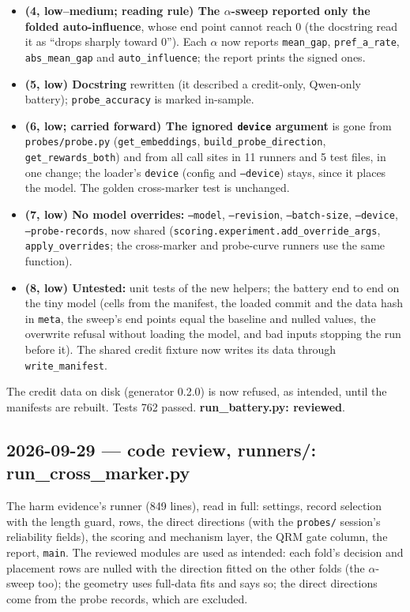 \documentclass{article}
\begin{document}
\begin{itemize}
  \item \textbf{(4, low--medium; reading rule) The $\alpha$-sweep reported only the folded auto-influence}, whose
        end point cannot reach 0 (the docstring read it as ``drops sharply toward 0''). Each $\alpha$ now reports
        \texttt{mean\_gap}, \texttt{pref\_a\_rate}, \texttt{abs\_mean\_gap} and \texttt{auto\_influence}; the report
        prints the signed ones.
  \item \textbf{(5, low) Docstring} rewritten (it described a credit-only, Qwen-only battery); \texttt{probe\_accuracy}
        is marked in-sample.
  \item \textbf{(6, low; carried forward) The ignored \texttt{device} argument} is gone from \texttt{probes/probe.py}
        (\texttt{get\_embeddings}, \texttt{build\_probe\_direction}, \texttt{get\_rewards\_both}) and from all call
        sites in 11 runners and 5 test files, in one change; the loader's \texttt{device} (config and
        \texttt{--device}) stays, since it places the model. The golden cross-marker test is unchanged.
  \item \textbf{(7, low) No model overrides:} \texttt{--model}, \texttt{--revision}, \texttt{--batch-size},
        \texttt{--device}, \texttt{--probe-records}, now shared (\texttt{scoring.experiment.add\_override\_args},
        \texttt{apply\_overrides}; the cross-marker and probe-curve runners use the same function).
  \item \textbf{(8, low) Untested:} unit tests of the new helpers; the battery end to end on the tiny model (cells
        from the manifest, the loaded commit and the data hash in \texttt{meta}, the sweep's end points equal the
        baseline and nulled values, the overwrite refusal without loading the model, and bad inputs stopping the run
        before it). The shared credit fixture now writes its data through \texttt{write\_manifest}.
\end{itemize}
The credit data on disk (generator 0.2.0) is now refused, as intended, until the manifests are rebuilt.
Tests 762 passed. \textbf{run\_battery.py: reviewed}.

\subsection*{2026-09-29 --- code review, runners/: run\_cross\_marker.py}
The harm evidence's runner (849 lines), read in full: settings, record selection with the length guard, rows,
the direct directions (with the \texttt{probes/} session's reliability fields), the scoring and mechanism layer,
the QRM gate column, the report, \texttt{main}. The reviewed modules are used as intended: each fold's decision
and placement rows are nulled with the direction fitted on the other folds (the $\alpha$-sweep too); the geometry
uses full-data fits and says so; the direct directions come from the probe records, which are excluded.
\end{document}
